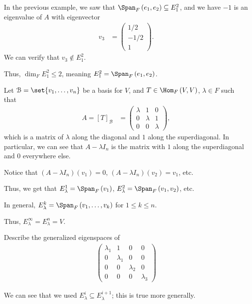 \documentclass[10pt]{mypackage}
\begin{document}
\begin{example}
  In the previous example, we saw that $\Span_{F}\left(e_1,e_2\right)\subseteq E_{1}^{2}$, and we have $-1$ is an eigenvalue of $A$ with eigenvector
  \begin{align*}
    v_3 &= \begin{pmatrix}1/2\\-1/2\\1\end{pmatrix}.
  \end{align*}
  We can verify that $v_3 \notin E_{1}^{2}$.\newline

  Thus, $\dim_{F}E_{1}^{2} \leq 2$, meaning $E_{1}^{2} = \Span_{F}\left(e_1,e_2\right)$.
\end{example}
\begin{example}
  Let $\mathcal{B} = \set{v_1,\dots,v_n}$ be a basis for $V$, and $T\in \Hom_{F}\left(V,V\right)$, $\lambda \in F$ such that
  \begin{align*}
    A = \left[T\right]_{\mathcal{B}} &= \begin{pmatrix}\lambda & 1 & 0 \\ 0 & \lambda & 1 \\ 0 & 0 & \lambda\end{pmatrix},
  \end{align*}
  which is a matrix of $\lambda$ along the diagonal and $1$ along the superdiagonal. In particular, we can see that $A - \lambda I_{n}$ is the matrix with $1$ along the superdiagonal and $0$ everywhere else.\newline

  Notice that $\left(A - \lambda I_{n}\right)(v_1) = 0$, $\left(A - \lambda I_{n}\right)\left(v_2\right) = v_1$, etc.\newline

  Thus, we get that $E_{\lambda}^{1} = \Span_{F}\left(v_1\right)$, $E_{\lambda}^{2} = \Span_{F}\left(v_1,v_2\right)$, etc.\newline

  In general, $E_{\lambda}^{k} = \Span_{F}\left(v_1,\dots,v_k\right)$ for $1 \leq k \leq n$.\newline

  Thus, $E_{\lambda}^{\infty} = E_{\lambda}^{n} = V$.
\end{example}
\begin{exercise}
  Describe the generalized eigenspaces of
  \begin{align*}
    \begin{pmatrix}\lambda_1 & 1 & 0 & 0 \\ 0 & \lambda_1 & 0 & 0 \\ 0 & 0 & \lambda_2 & 0 \\ 0 & 0 & 0 & \lambda_3\end{pmatrix}
  \end{align*}
\end{exercise}
We can see that we used $E_{\lambda}^{i} \subseteq E_{\lambda}^{i+1}$; this is true more generally.\newline
\end{document}
